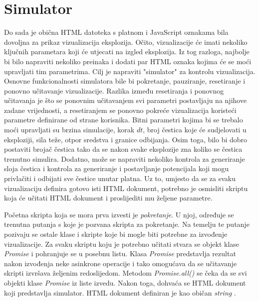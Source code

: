 \documentclass{foi}
\begin{document}
\section{Simulator}
Do sada je obična HTML datoteka s platnom i JavaScript oznakama bila dovoljna za prikaz vizualizacija eksplozija. Očito, vizualizacije će imati nekoliko ključnih parametara koji će utjecati na izgled eksplozija. Iz tog razloga, najbolje bi bilo napraviti nekoliko preinaka i dodati par HTML oznaka kojima će se moći upravljati tim parametrima. Cilj je napraviti "simulator" za kontrolu vizualizacija. Osnovne funkcionalnosti simulatora bile bi pokretanje, pauziranje, resetiranje i ponovno učitavanje vizualizacije. Razlika između resetiranja i ponovnog učitavanja je što se ponovnim učitavanjem svi parametri postavljaju na njihove zadane vrijednosti, a resetiranjem se ponovno pokreće vizualizacija koristeći parametre definirane od strane korisnika. Bitni parametri kojima bi se trebalo moći upravljati su brzina simulacije, korak $dt$, broj čestica koje će sudjelovati u eksploziji, sila teže, otpor sredstva i granice odbijanja. Osim toga, bilo bi dobro postaviti brojač čestica tako da se nakon svake eksplozije zna koliko se čestica trenutno simulira. Dodatno, može se napraviti nekoliko kontrola za generiranje sloja čestica i kontrola za generiranje i postavljanje potencijala koji mogu privlačiti i odbijati sve čestice unutar platna. Uz to, umjesto da se za svaku vizualizaciju definira gotovo isti HTML dokument, potrebno je osmisliti skriptu koja će učitati HTML dokument i proslijediti mu željene parametre.

Početna skripta koja se mora prva izvesti je \textit{pokretanje}. U njoj, određuje se trenutna putanja s koje je pozvana skripta za pokretanje. Na temelju te putanje pozivaju se ostale klase i skripte koje bi mogle biti potrebne za izvođenje vizualizacije. Za svaku skriptu koju je potrebno učitati stvara se objekt klase \textit{Promise} i pohranjuje se u posebnu listu. Klasa \textit{Promise} predstavlja rezultat nakon izvođenja neke asinkrone operacije i tako omogućava da se učitavanje skripti izvršava željenim redoslijedom. Metodom \textit{Promise.all()} se čeka da se svi objekti klase \textit{Promise} iz liste izvedu. Nakon toga, dohvaća se HTML dokument koji predstavlja simulator. HTML dokument definiran je kao običan \textit{string} \parencite{PromiseFirefox}.
\end{document}
